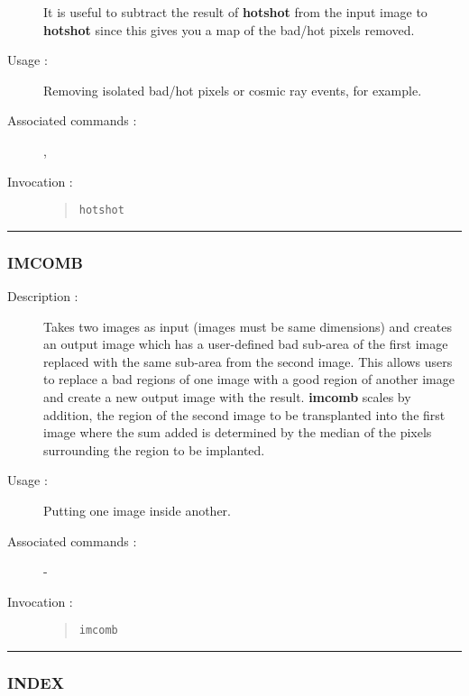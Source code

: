 \begin{description}
\begin{enumerate}
\end{enumerate}

It is useful to subtract the result of {\bf hotshot} from the input
image to {\bf hotshot} since this gives you a map of the bad/hot pixels
removed.

\item[Usage :] Removing isolated bad/hot pixels or cosmic ray events, for
example.

\item[Associated commands :] {\tt {}},
{\tt {}}

\item[Invocation :]

\begin{quote}{\tt  hotshot }\end{quote}

\end{description}

\hrule
\subsubsection*{\label{IMCOMB}IMCOMB}

\begin{description}

\item[Description :] Takes two images as input (images must be same
dimensions) and creates an output image which has a user-defined bad
sub-area of the first image replaced with the same sub-area from the
second image.  This allows users to replace a bad regions of one image
with a good region of another image and create a new output image with
the result.  {\bf imcomb} scales by addition, the region of the second image
to be transplanted into the first image where the sum added is
determined by the median of the pixels surrounding the region to be
implanted.

\item[Usage :] Putting one image inside another.
\item[Associated commands :] -
\item[Invocation :]

\begin{quote}{\tt  imcomb }\end{quote}

\end{description}

\hrule
\subsubsection*{\label{INDEX}INDEX}

